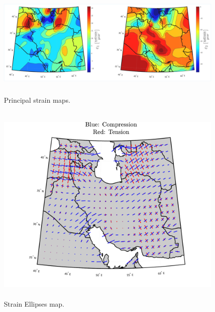 \documentclass[12pt]{article}
\begin{document}
	\begin{figure}[h!]
		\centering
		\includegraphics[height=5.5cm]{./Plots/PrincipalStrainMaps.pdf}
		\caption{Principal strain maps.}
		\label{fig:Principal}
	\end{figure}
	\clearpage
	
	\begin{figure}[h!]
		\centering
		\includegraphics[height=10cm]{./Plots/StrainEllipse.pdf}
		\caption{Strain Ellipses map.}
		\label{fig:Ellipse}
	\end{figure}
	\clearpage
	
\end{document}
